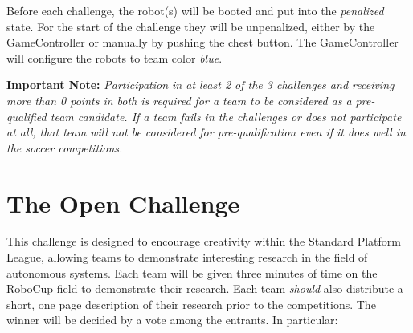\documentclass{article}
\begin{document}
Before each challenge, the robot(s) will be booted and put into the \emph{penalized} 
state. For the start of the challenge they will be unpenalized, either by the 
GameController or manually by pushing the chest button. The GameController will 
configure the robots to team color \emph{blue}.

\textbf{Important Note:} \emph{Participation in at least 2 of the 3 challenges and 
receiving more than 0 points in both is required for a team to be considered as 
a pre-qualified team candidate. If a team fails in the challenges or does not 
participate at all, that team will not be considered for pre-qualification even 
if it does well in the soccer competitions.}

\section{The Open Challenge}
\label{sec:open}
\newcommand{\openMinNum}{three}

This challenge is designed to encourage creativity within the Standard 
Platform League, allowing teams to demonstrate interesting research in 
the field of autonomous systems. Each team will be given \openMinNum{} 
minutes of time on the RoboCup field to demonstrate their research. 
Each team \emph{should} also distribute a short, one page description of 
their research prior to the competitions. The winner will be decided by 
a vote among the entrants. In particular:
\end{document}

